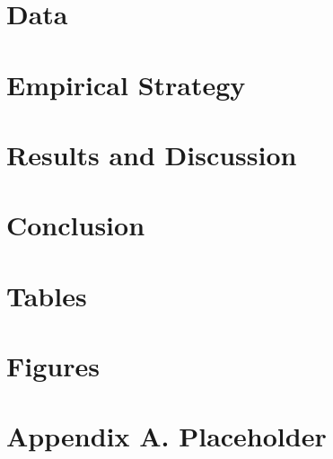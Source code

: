 \documentclass[12pt]{article}
\begin{document}
\section{Data} \label{sec:data}

\section{Empirical Strategy} \label{sec:empirical_strategy}

\section{Results and Discussion} \label{sec:result}

\section{Conclusion} \label{sec:conclusion}



\singlespacing
\setlength\bibsep{0pt}





\clearpage

\onehalfspacing

\section*{Tables} \label{sec:tab}






\clearpage

\section*{Figures} \label{sec:fig}



\clearpage

\section*{Appendix A. Placeholder} \label{sec:appendixa}
\end{document}
